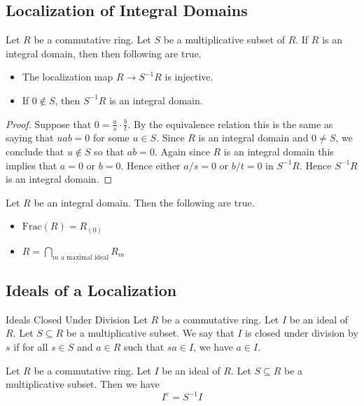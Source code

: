 \documentclass[a4paper]{article}
\begin{document}
\subsection{Localization of Integral Domains}
\begin{lmm}{}{} Let $R$ be a commutative ring. Let $S$ be a multiplicative subset of $R$. If $R$ is an integral domain, then then following are true. 
\begin{itemize}
\item The localization map $R\to S^{-1}R$ is injective. 
\item If $0\notin S$, then $S^{-1}R$ is an integral domain. 
\end{itemize} \tcbline
\begin{proof}
Suppose that $0=\frac{a}{s}\cdot\frac{b}{t}$. By the equivalence relation this is the same as saying that $uab=0$ for some $u\in S$. Since $R$ is an integral domain and $0\neq S$, we conclude that $u\notin S$ so that $ab=0$. Again since $R$ is an integral domain this implies that $a=0$ or $b=0$. Hence either $a/s=0$ or $b/t=0$ in $S^{-1}R$. Hence $S^{-1}R$ is an integral domain. 
\end{proof}
\end{lmm}

\begin{prp}{}{} Let $R$ be an integral domain. Then the following are true. 
\begin{itemize}
\item $\text{Frac}(R)=R_{(0)}$
\item $R=\bigcap_{m\text{ a maximal ideal}}R_m$
\end{itemize}
\end{prp}

\subsection{Ideals of a Localization}
\begin{defn}{Ideals Closed Under Division}{} Let $R$ be a commutative ring. Let $I$ be an ideal of $R$. Let $S\subseteq R$ be a multiplicative subset. We say that $I$ is closed under division by $s$ if for all $s\in S$ and $a\in R$ such that $sa\in I$, we have $a\in I$. 
\end{defn}

\begin{lmm}{}{} Let $R$ be a commutative ring. Let $I$ be an ideal of $R$. Let $S\subseteq R$ be a multiplicative subset. Then we have $$I^e=S^{-1}I$$
\end{lmm}
\end{document}
